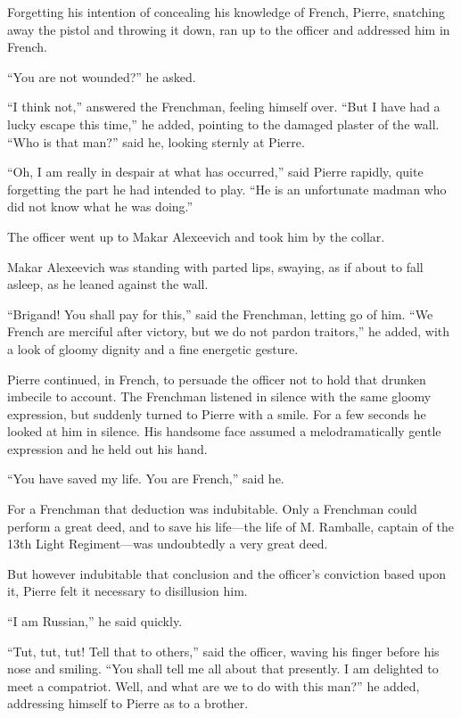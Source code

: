 Forgetting his intention of concealing his knowledge of French,
Pierre, snatching away the pistol and throwing it down, ran up to
the officer and addressed him in French.

``You are not wounded?'' he asked.

``I think not,'' answered the Frenchman, feeling himself
over. ``But I have had a lucky escape this time,'' he added,
pointing to the damaged plaster of the wall. ``Who is that man?''
said he, looking sternly at Pierre.

``Oh, I am really in despair at what has occurred,'' said Pierre
rapidly, quite forgetting the part he had intended to play. ``He
is an unfortunate madman who did not know what he was doing.''

The officer went up to Makar Alexeevich and took him by the
collar.

Makar Alexeevich was standing with parted lips, swaying, as if
about to fall asleep, as he leaned against the wall.

``Brigand! You shall pay for this,'' said the Frenchman, letting
go of him. ``We French are merciful after victory, but we do not
pardon traitors,'' he added, with a look of gloomy dignity and a
fine energetic gesture.

Pierre continued, in French, to persuade the officer not to hold
that drunken imbecile to account. The Frenchman listened in
silence with the same gloomy expression, but suddenly turned to
Pierre with a smile. For a few seconds he looked at him in
silence. His handsome face assumed a melodramatically gentle
expression and he held out his hand.

``You have saved my life. You are French,'' said he.

For a Frenchman that deduction was indubitable. Only a Frenchman
could perform a great deed, and to save his life---the life of
M. Ramballe, captain of the 13th Light Regiment---was undoubtedly
a very great deed.

But however indubitable that conclusion and the officer's
conviction based upon it, Pierre felt it necessary to disillusion
him.

``I am Russian,'' he said quickly.

``Tut, tut, tut! Tell that to others,'' said the officer, waving
his finger before his nose and smiling. ``You shall tell me all
about that presently. I am delighted to meet a compatriot. Well,
and what are we to do with this man?'' he added, addressing
himself to Pierre as to a brother.

